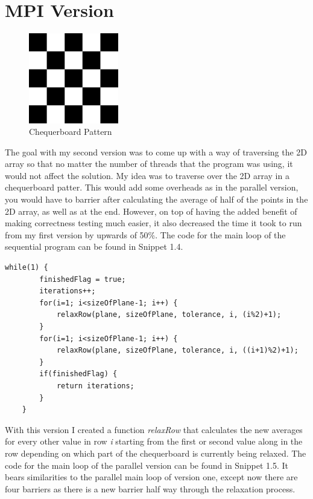 \documentclass{report}
\begin{document}
\section{MPI Version}
\begin{figure}
\vspace{-30pt}
\includegraphics[width=0.35\textwidth]{checkerboard}
\caption{Chequerboard Pattern}
\label{fig:subim1}
\end{figure}
The goal with my second version was to come up with a way of traversing the 2D array so that no matter the number of threads that the program was using, it would not affect the solution. My idea was to traverse over the 2D array in a chequerboard patter. This would add some overheads as in the parallel version, you would have to barrier after calculating the average of half of the points in the 2D array, as well as at the end. However, on top of having the added benefit of making correctness testing much easier, it also decreased the time it took to run from my first version by upwards of 50\%. The code for the main loop of the sequential program can be found in Snippet 1.4.
\\
\begin{lstlisting}[style=customc,caption=Version 2 Sequential Main Loop]
    while(1) {
        finishedFlag = true;
        iterations++;
        for(i=1; i<sizeOfPlane-1; i++) {
            relaxRow(plane, sizeOfPlane, tolerance, i, (i%2)+1);
        }
        for(i=1; i<sizeOfPlane-1; i++) {
            relaxRow(plane, sizeOfPlane, tolerance, i, ((i+1)%2)+1);
        }
        if(finishedFlag) {
            return iterations;
        }
    }
\end{lstlisting}
With this version I created a function \textit{relaxRow} that calculates the new averages for every other value in row \textit{i} starting from the first or second value along in the row depending on which part of the chequerboard is currently being relaxed. The code for the main loop of the parallel version can be found in Snippet 1.5. It bears similarities to the parallel main loop of version one, except now there are four barriers as there is a new barrier half way through the relaxation process.
\end{document}
